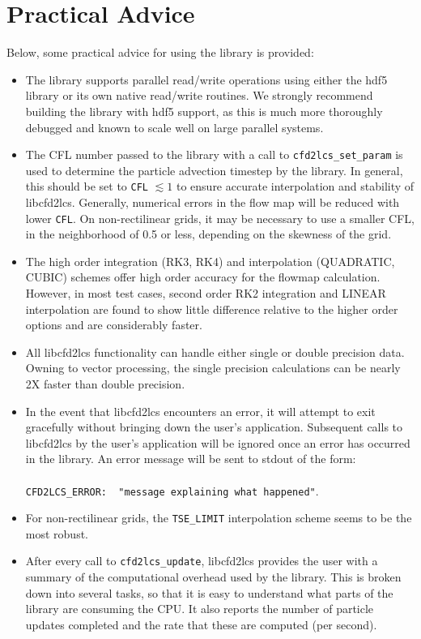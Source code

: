 \documentclass[letterpaper,11pt]{article}
\begin{document}
\section{Practical Advice}
Below, some practical advice for using the library is provided:
\begin{itemize}
 \item The library supports parallel read/write operations using either the hdf5 library or its own native read/write routines. We strongly recommend building the library with hdf5 support, as this is much more thoroughly debugged and known to scale well on large parallel systems.
 \item The CFL number passed to the library with a call to \verb|cfd2lcs_set_param| is used to determine the particle advection timestep by the library.  In general, this should be set to \verb|CFL| $\lesssim 1$ to ensure accurate interpolation and stability of libcfd2lcs.  Generally, numerical errors in the flow map will be reduced with lower \verb|CFL|.  On non-rectilinear grids, it may be necessary to use a smaller CFL, in the neighborhood of 0.5 or less, depending on the skewness of the grid.
\item The high order integration (RK3, RK4) and interpolation (QUADRATIC, CUBIC) schemes offer high order accuracy for the flowmap calculation.  However, in most test cases, second order RK2 integration and LINEAR interpolation are found to show little difference relative to the higher order options and are considerably faster.
\item All libcfd2lcs functionality can handle either single or double precision data.  Owning to vector processing, the single precision calculations can be nearly 2X faster than double precision.
\item In the event that libcfd2lcs encounters an error, it will attempt to exit gracefully without bringing down the user's application. Subsequent calls to libcfd2lcs by the user's application will be ignored once an error has occurred in the library.  An error message will be sent to stdout of the form:\\  \\ \verb|CFD2LCS_ERROR:  "message explaining what happened"|.\\
\item For non-rectilinear grids, the \verb|TSE_LIMIT| interpolation scheme seems to be the most robust.
\item After every call to \verb|cfd2lcs_update|, libcfd2lcs provides the user with a summary of the computational overhead used by the library.  This is broken down into several tasks, so that it is easy to understand what parts of the library are consuming the CPU.  It also reports the number of particle updates completed and the rate that these are computed (per second).

\end{itemize}
\end{document}
